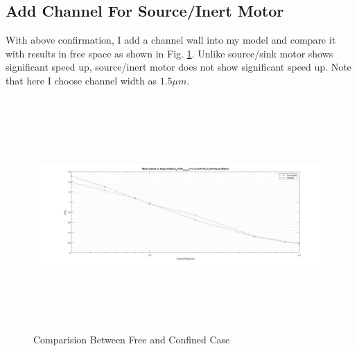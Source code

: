 \documentclass[fontsize=11pt, %
                             paper=a4, %
                             twoside, %
                             captions=tableheading,
                             index=totoc,
                             hyperref]{labbook}
\begin{document}
\begin{addmargin}[4cm]{0cm}
\subsection*{Add Channel For Source/Inert Motor}
With above confirmation, I add a channel wall into my model and compare it with results in free space as shown in Fig. \ref{2016-11-13-CBFACC}. Unlike source/sink motor shows significant speed up, source/inert motor does not show significant speed up. Note that here I choose channel width as $1.5 \mu m$.
\begin{figure}
\centering
\includegraphics[width=\linewidth, height=3.5in]{2016-11-13-eta-0.jpg}
\caption{Comparision Between Free and Confined Case}\label{2016-11-13-CBFACC}
\end{figure}

\end{addmargin}
\end{document}
